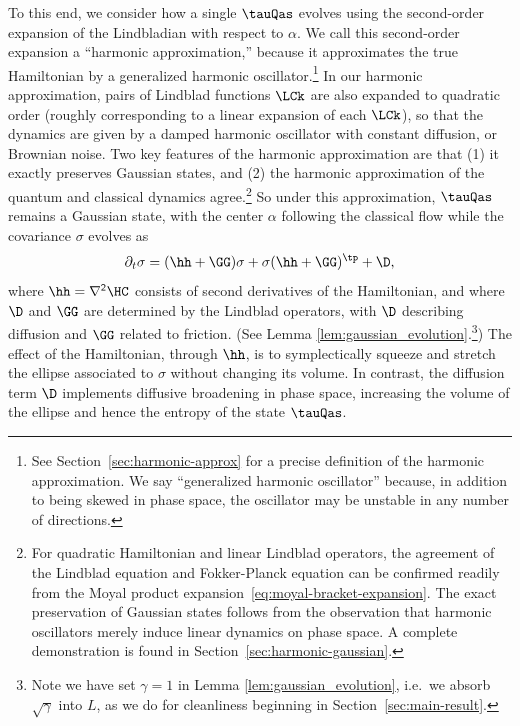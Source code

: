 \documentclass{article}
\numberwithin{equation}{section}
\begin{document}
To this end, we consider how a single $\tauQas$ evolves using the second-order expansion of the Lindbladian with respect to $\alpha$. We call this second-order expansion a ``harmonic approximation,'' because it approximates the true Hamiltonian by a generalized harmonic oscillator.\footnote{See Section~\ref{sec:harmonic-approx} for a precise definition of the harmonic approximation. We say ``generalized harmonic oscillator'' because, in addition to being skewed in phase space, the oscillator may be unstable in any number of directions.} 
In our harmonic approximation, pairs of Lindblad functions $\LCk$ are also expanded to quadratic order (roughly corresponding to a linear expansion of each $\LCk$), 
so that the dynamics are given by a damped harmonic oscillator with constant diffusion, or Brownian noise.  
Two key features of the harmonic approximation are that (1) it exactly preserves Gaussian states, and (2) the harmonic approximation of the quantum and classical dynamics agree.\footnote{For quadratic Hamiltonian and linear Lindblad operators, the agreement of the Lindblad equation and Fokker-Planck equation can be confirmed readily from the Moyal product expansion~\eqref{eq:moyal-bracket-expansion}. The exact preservation of Gaussian states follows from the observation that harmonic oscillators merely induce linear dynamics on phase space. A complete demonstration is found in Section~\ref{sec:harmonic-gaussian}.}
So under this approximation, $\tauQas$ remains a Gaussian state, with the center $\alpha$ following the classical flow 
while the covariance $\sigma$ evolves as
\begin{equation}
    \label{eq:cov-growth-intro}
    \partial_t \sigma = 
        (\hh + \GG) \sigma + \sigma (\hh + \GG)^\tp + \D,
\end{equation}
where $\hh = \sf \nabla^2 \HC$ consists of second derivatives of the Hamiltonian, and where $\D$ and $\GG$ are determined by the Lindblad operators, with $\D$ describing diffusion and $\GG$ related to friction.  (See Lemma \ref{lem:gaussian_evolution}.\footnote{Note we have set $\gamma=1$ in Lemma \ref{lem:gaussian_evolution}, i.e.\ we absorb $\sqrt{\gamma}$ into $L$, as we do for cleanliness beginning in Section~\ref{sec:main-result}.})  The effect of the Hamiltonian, through $\hh$, is to symplectically squeeze and stretch the ellipse associated to $\sigma$ without changing its volume.  In contrast, the diffusion term $\D$ implements diffusive broadening in phase space, increasing the volume of the ellipse and hence the entropy of the state $\tauQas$. 
\end{document}
